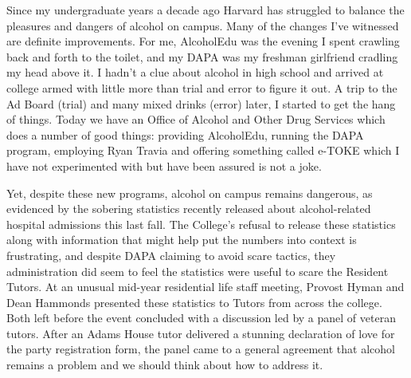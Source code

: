 
Since my undergraduate years a decade ago Harvard has struggled to balance
the pleasures and dangers of alcohol on campus. Many of the changes I've
witnessed are definite improvements. For me, AlcoholEdu was the evening I
spent crawling back and forth to the toilet, and my DAPA was my freshman
girlfriend cradling my head above it. I hadn't a clue about alcohol in high
school and arrived at college armed with little more than trial and error to
figure it out. A trip to the Ad Board (trial) and many mixed drinks (error)
later, I started to get the hang of things. Today we have an Office of
Alcohol and Other Drug Services which does a number of good things: providing
AlcoholEdu, running the DAPA program, employing Ryan Travia and offering
something called e-TOKE which I have not experimented with but have been
assured is not a joke.

Yet, despite these new programs, alcohol on campus remains dangerous, as
evidenced by the sobering statistics recently released about alcohol-related
hospital admissions this last fall. The College's refusal to release these
statistics along with information that might help put the numbers into
context is frustrating, and despite DAPA claiming to avoid scare tactics,
they administration did seem to feel the statistics were useful to scare the
Resident Tutors. At an unusual mid-year residential life staff meeting,
Provost Hyman and Dean Hammonds presented these statistics to Tutors from
across the college. Both left before the event concluded with a discussion
led by a panel of veteran tutors. After an Adams House tutor delivered a
stunning declaration of love for the party registration form, the panel came
to a general agreement that alcohol remains a problem and we should think
about how to address it.


